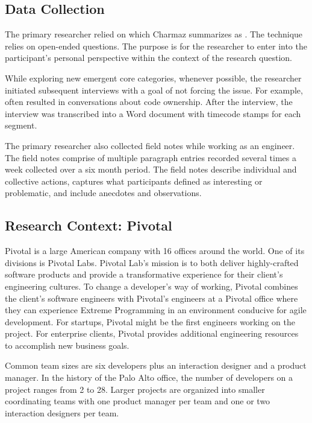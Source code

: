 \subsection{Data Collection}
The primary researcher relied on  which Charmaz summarizes as  \cite{Charmaz}. The technique relies on open-ended questions. The purpose is for the researcher to enter into the participant's personal perspective within the context of the research question. 

While exploring new emergent core categories, whenever possible, the researcher initiated subsequent interviews with a goal of not forcing the issue. For example,  often resulted in conversations about code ownership. After the interview, the interview was transcribed into a Word document with timecode stamps for each segment.

The primary researcher also collected field notes while working as an engineer. The field notes comprise of multiple paragraph entries recorded several times a week collected over a six month period. The field notes describe individual and collective actions, captures what participants defined as interesting or problematic, and include anecdotes and observations. 
\subsection{Research Context: Pivotal}
\label{ResearchContext}
Pivotal is a large American company with 16 offices around the world. One of its divisions is Pivotal Labs. Pivotal Lab's mission is to both deliver highly-crafted software products and provide a transformative experience for their client's engineering cultures. To change a developer's way of working, Pivotal combines the client's software engineers with Pivotal's engineers at a Pivotal office where they can experience Extreme Programming in an environment conducive for agile development. For startups, Pivotal might be the first engineers working on the project. For enterprise clients, Pivotal provides additional engineering resources to accomplish new business goals. 

Common team sizes are six developers plus an interaction designer and a product manager. In the history of the Palo Alto office, the number of developers on a project ranges from 2 to 28. Larger projects are organized into smaller coordinating teams with one product manager per team and one or two interaction designers per team.

